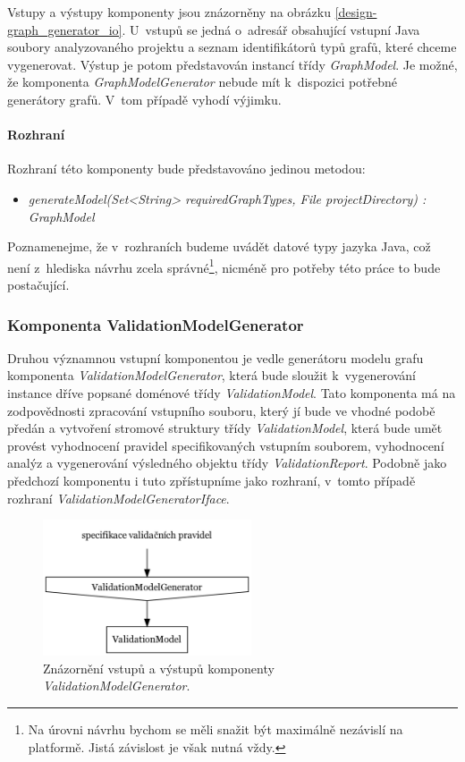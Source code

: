 Vstupy a výstupy komponenty jsou znázorněny na obrázku \ref{design-graph_generator_io}. U~vstupů se jedná o~adresář obsahující vstupní Java soubory analyzovaného projektu a seznam identifikátorů typů grafů, které chceme vygenerovat. Výstup je potom představován instancí třídy \emph{GraphModel}. Je možné, že komponenta  \emph{GraphModelGenerator} nebude mít k~dispozici potřebné generátory grafů. V~tom případě vyhodí výjimku.

\paragraph{Rozhraní}
Rozhraní této komponenty bude představováno jedinou metodou:
\begin{itemize}
\item \emph{generateModel(Set<String> requiredGraphTypes, File projectDirectory) : GraphModel}
\end{itemize}

Poznamenejme, že v~rozhraních budeme uvádět datové typy jazyka Java, což není z~hlediska návrhu zcela správné\footnote{Na úrovni návrhu bychom se měli snažit být maximálně nezávislí na platformě. Jistá závislost je však nutná vždy.}, nicméně pro potřeby této práce to bude postačující.

\subsubsection{Komponenta ValidationModelGenerator}
Druhou významnou vstupní komponentou je vedle generátoru modelu grafu komponenta \emph{ValidationModelGenerator}, která bude sloužit k~vygenerování instance dříve popsané doménové třídy \emph{ValidationModel}. Tato komponenta má na zodpovědnosti zpracování vstupního souboru, který jí bude ve vhodné podobě předán a vytvoření stromové struktury třídy \emph{ValidationModel}, která bude umět provést vyhodnocení pravidel specifikovaných vstupním souborem, vyhodnocení analýz a vygenerování výsledného objektu třídy \emph{ValidationReport}. Podobně jako předchozí komponentu i tuto zpřístupníme jako rozhraní, v~tomto případě rozhraní \emph{ValidationModelGeneratorIface}.

\begin{figure}[h!]
  \centering
  \includegraphics[width=0.55\textwidth]{./graphs/validation_model_generator_io_graph.png}
  \caption{Znázornění vstupů a výstupů komponenty \emph{ValidationModelGenerator}.\label{design-validation_model_generator_io}}
\end{figure}

